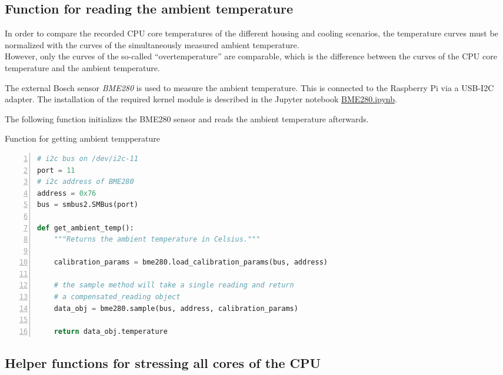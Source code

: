 \documentclass[10pt,parskip=half,
toc=sectionentrywithdots,
bibliography=totocnumbered,
captions=tableheading,numbers=noendperiod]{scrartcl}
\begin{document}
\hypertarget{function-for-reading-the-ambient-temperature}{%
\subsection{Function for reading the ambient
temperature}\label{function-for-reading-the-ambient-temperature}}

In order to compare the recorded CPU core temperatures of the different
housing and cooling scenarios, the temperature curves must be normalized
with the curves of the simultaneously measured ambient temperature.\\
However, only the curves of the so-called ``overtemperature'' are
comparable, which is the difference between the curves of the CPU core
temperature and the ambient temperature.

The external Bosch sensor \emph{BME280} is used to measure the ambient
temperature. This is connected to the Raspberry Pi via a USB-I2C
adapter. The installation of the required kernel module is described in
the Jupyter notebook
\href{Raspberry_Pi4_stress_test_files/BME280.ipynb}{BME280.ipynb}.

The following function initializes the BME280 sensor and reads the
ambient temperature afterwards.

\begin{codecell}[H]
\caption{Function for getting ambient tempperature}
\label{code:f_get_ambient_temp}
\begin{lstlisting}[language=Python,numbers=left,xleftmargin=20pt,xrightmargin=5pt,belowskip=5pt,aboveskip=5pt]
# i2c bus on /dev/i2c-11
port = 11
# i2c address of BME280
address = 0x76
bus = smbus2.SMBus(port)

def get_ambient_temp():
    """Returns the ambient temperature in Celsius."""

    calibration_params = bme280.load_calibration_params(bus, address)

    # the sample method will take a single reading and return
    # a compensated_reading object
    data_obj = bme280.sample(bus, address, calibration_params)

    return data_obj.temperature
\end{lstlisting}\end{codecell}

\hypertarget{helper-functions-for-stressing-all-cores-of-the-cpu}{%
\subsection{Helper functions for stressing all cores of the
CPU}\label{helper-functions-for-stressing-all-cores-of-the-cpu}}
\end{document}
